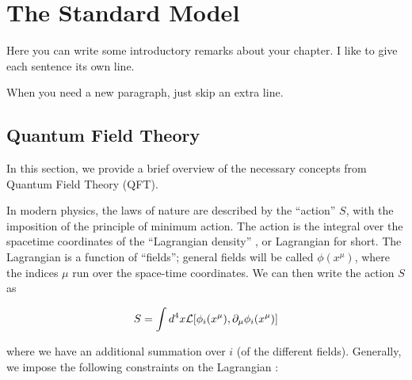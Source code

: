 

\chapter[Quantum Field Theory and Symmetries][Top of Page Title]{The Standard Model}

Here you can write some introductory remarks about your chapter.
I like to give each sentence its own line.

When you need a new paragraph, just skip an extra line.

\section{Quantum Field Theory}


In this section, we provide a brief overview of the necessary concepts from Quantum Field Theory (QFT).

In modern physics, the laws of nature are described by the ``action'' $S$, with the imposition of the principle of minimum action. 
The action is the integral over the spacetime coordinates of the ``Lagrangian density'' \Lagr, or Lagrangian for short.
The Lagrangian is a function of ``fields''; general fields will be called $\phi(x^\mu)$, where the indices $\mu$ run over the space-time coordinates.
We can then write the action $S$ as

\begin{equation}
S = \int d^4 x \mathcal{L}[ \phi_i(x^\mu) , \partial_\mu \phi_i(x^\mu)]
\end{equation}

where we have an additional summation over $i$ (of the different fields).
Generally, we impose the following constraints on the Lagrangian :

